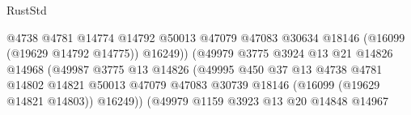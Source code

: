 \begin{lexlean}{RustStd}
\begin{coremodule}
                                                    @4738
                                                    @4781
                                                    @14774
                                                    @14792
                                                    @50013
                                                    @47079
                                                    @47083
                                                    @30634
                                                    @18146
                                                    (@16099 (@19629 @14792 @14775))
                                                    @16249))
                                                (@49979
                                                  @3775
                                                  @3924
                                                  @13
                                                  @21
                                                  @14826
                                                  @14968
                                                  (@49987
                                                    @3775
                                                    @13
                                                    @14826
                                                    (@49995
                                                      @450
                                                      @37
                                                      @13
                                                      @4738
                                                      @4781
                                                      @14802
                                                      @14821
                                                      @50013
                                                      @47079
                                                      @47083
                                                      @30739
                                                      @18146
                                                      (@16099 (@19629 @14821 @14803))
                                                      @16249))
                                                  (@49979
                                                    @1159
                                                    @3923
                                                    @13
                                                    @20
                                                    @14848
                                                    @14967

\end{coremodule}
\end{lexlean}

